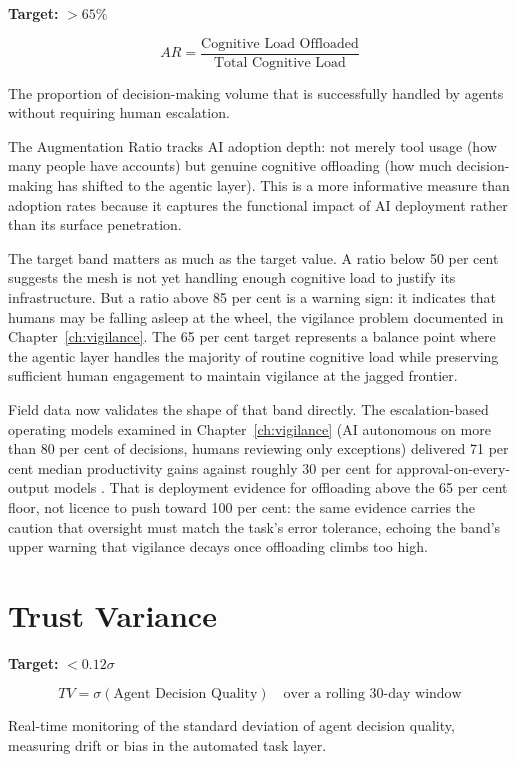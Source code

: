 \begin{definitionbox}[title={Augmentation Ratio (AR)}]
\textbf{Target:} $> 65\%$

\[
AR = \frac{\text{Cognitive Load Offloaded}}{\text{Total Cognitive Load}}
\]

The proportion of decision-making volume that is successfully handled by agents without requiring human escalation.
\end{definitionbox}

The Augmentation Ratio tracks AI adoption depth: not merely tool usage (how many people have accounts) but genuine cognitive offloading (how much decision-making has shifted to the agentic layer). This is a more informative measure than adoption rates because it captures the functional impact of AI deployment rather than its surface penetration.

The target band matters as much as the target value. A ratio below 50 per cent suggests the mesh is not yet handling enough cognitive load to justify its infrastructure. But a ratio above 85 per cent is a warning sign: it indicates that humans may be falling asleep at the wheel, the vigilance problem documented in Chapter~\ref{ch:vigilance}. The 65 per cent target represents a balance point where the agentic layer handles the majority of routine cognitive load while preserving sufficient human engagement to maintain vigilance at the jagged frontier.

Field data now validates the shape of that band directly. The escalation-based operating models examined in Chapter~\ref{ch:vigilance} (AI autonomous on more than 80 per cent of decisions, humans reviewing only exceptions) delivered 71 per cent median productivity gains against roughly 30 per cent for approval-on-every-output models \parencite{Pereira2026Playbook}. That is deployment evidence for offloading above the 65 per cent floor, not licence to push toward 100 per cent: the same evidence carries the caution that oversight must match the task's error tolerance, echoing the band's upper warning that vigilance decays once offloading climbs too high.

\section{Trust Variance}

\begin{definitionbox}[title={Trust Variance (TV)}]
\textbf{Target:} $< 0.12\sigma$

\[
TV = \sigma \left( \text{Agent Decision Quality} \right) \quad \text{over a rolling 30-day window}
\]

Real-time monitoring of the standard deviation of agent decision quality, measuring drift or bias in the automated task layer.
\end{definitionbox}

